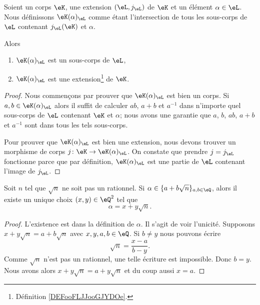 \begin{propositionDef}  \label{DEFooVSKGooMyeGel}
	Soient un corps \( \eK\), une extension \( (\eL,j_{\eL})\) de \( \eK\) et un élément \( \alpha\in\eL\). Nous définissons \( \eK(\alpha)_{\eL} \) comme étant l'intersection de tous les sous-corps de \( \eL\) contenant \( j_{\eL}(\eK)\) et \( \alpha\).

	Alors
	\begin{enumerate}
		\item
		      \( \eK(\alpha)_{\eL}\) est un sous-corps de \( \eL\),
		\item
		      \( \eK(\alpha)_{\eL}\) est une extension\footnote{Définition \ref{DEFooFLJJooGJYDOe}.} de \( \eK\).
	\end{enumerate}
\end{propositionDef}

\begin{proof}
	Nous commençons par prouver que \( \eK(\alpha)_{\eL}\) est bien un corps. Si \( a,b\in \eK(\alpha)_{\eL}\) alors il suffit de calculer \( ab\), \( a+b\) et \( a^{-1}\) dans n'importe quel sous-corps de \( \eL\) contenant \( \eK\) et \( \alpha\); nous avons une garantie que \( a\), \( b\), \( ab  \), \( a+b\) et \( a^{-1}\) sont dans tous les tels sous-corps.

	Pour prouver que \( \eK(\alpha)_\eL\) est bien une extension, nous devons trouver un morphisme de corps \( j\colon \eK\to \eK(\alpha)_{\eL}\). On constate que prendre \( j=j_{\eL}\) fonctionne parce que par définition, \( \eK(\alpha)_{\eL}\) est une partie de \( \eL\) contenant l'image de \( j_{\eL}\).
\end{proof}

\begin{lemma}       \label{LEMooHZLCooPLHkLS}
	Soit \( n\) tel que \( \sqrt{ n }\) ne soit pas un rationnel. Si \( \alpha\in \{ a+b\sqrt{ n } \}_{a,b\in \eQ}\), alors il existe un unique choix \( (x,y)\in \eQ^2\) tel que
	\begin{equation}
		\alpha=x+y\sqrt{ n }.
	\end{equation}
\end{lemma}

\begin{proof}
	L'existence est dans la définition de \( \alpha\). Il s'agit de voir l'unicité. Supposons \( x+y\sqrt{ n }=a+b\sqrt{ n }\) avec \( x,y,a,b\in \eQ\). Si \( b\neq y\) nous pouvons écrire
	\begin{equation}
		\sqrt{ n }=\frac{ x-a }{ b-y }.
	\end{equation}
	Comme \( \sqrt{ n }\) n'est pas un rationnel, une telle écriture est impossible. Donc \( b=y\). Nous avons alors \( x+y\sqrt{ n }=a+y\sqrt{ n }\) et du coup aussi \( x=a\).
\end{proof}

